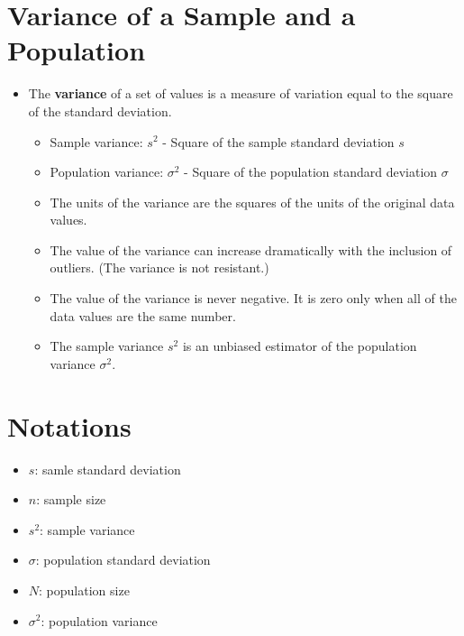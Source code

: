 \documentclass[]{book}
\providecommand{\tightlist}{%
  \setlength{\itemsep}{0pt}\setlength{\parskip}{0pt}}
\begin{document}
\hypertarget{variance-of-a-sample-and-a-population}{%
\section{Variance of a Sample and a Population}\label{variance-of-a-sample-and-a-population}}

\begin{itemize}
\tightlist
\item
  The \textbf{variance} of a set of values is a measure of variation equal to the square of the standard deviation.

  \begin{itemize}
  \tightlist
  \item
    Sample variance: \(s^2\) - Square of the sample standard deviation \(s\)
  \item
    Population variance: \(\sigma^2\) - Square of the population standard deviation \(\sigma\)
  \item
    The units of the variance are the squares of the units of the original data values.
  \item
    The value of the variance can increase dramatically with the inclusion of outliers. (The variance is not resistant.)
  \item
    The value of the variance is never negative. It is zero only when all of the data values are the same number.
  \item
    The sample variance \(s^2\) is an unbiased estimator of the population variance \(\sigma^2\).
  \end{itemize}
\end{itemize}

\hypertarget{notations-1}{%
\section{Notations}\label{notations-1}}

\begin{itemize}
\tightlist
\item
  \(s\): samle standard deviation
\item
  \(n\): sample size
\item
  \(s^2\): sample variance
\item
  \(\sigma\): population standard deviation
\item
  \(N\): population size
\item
  \(\sigma^2\): population variance
\end{itemize}
\end{document}
